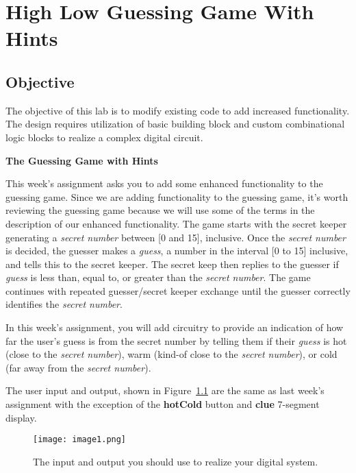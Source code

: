 \chapter{High Low Guessing Game With Hints}
\label{chapter:hlggwh}
\graphicspath{ {./Lab05HighLowWithHints/Fig} }

\hypertarget{objective}{%
\section{\texorpdfstring{Objective }{Objective }}
\label{section:objectiveHighLowGuessHints}}

The objective of this lab is to modify existing code to add increased
functionality. The design requires utilization of basic building block
and custom combinational logic blocks to realize a complex digital
circuit.

\textbf{The Guessing Game with Hints}

This week's assignment asks you to add some enhanced functionality to
the guessing game. Since we are adding functionality to the guessing
game, it's worth reviewing the guessing game because we will use some of
the terms in the description of our enhanced functionality. The game
starts with the secret keeper generating a \emph{secret number} between
{[}0 and 15{]}, inclusive. Once the \emph{secret number} is decided, the
guesser makes a \emph{guess}, a number in the interval {[}0 to 15{]}
inclusive, and tells this to the secret keeper. The secret keep then
replies to the guesser if \emph{guess} is less than, equal to, or
greater than the \emph{secret number}. The game continues with repeated
guesser/secret keeper exchange until the guesser correctly identifies
the \emph{secret number}.

In this week's assignment, you will add circuitry to provide an
indication of how far the user's guess is from the secret number by
telling them if their \emph{guess} is hot (close to the \emph{secret
number}), warm (kind-of close to the \emph{secret number}), or cold (far
away from the \emph{secret number}).

The user input and output, shown in Figure~\ref{fig:iOonDevBorad} are the same as last week's
assignment with the exception of the \textbf{hotCold} button and
\textbf{clue} 7-segment display.

\begin{figure}
\texttt{[image:  image1.png]}
\caption{The input and output you should use to realize your digital system.}
\label{fig:iOonDevBorad}
\end{figure}

